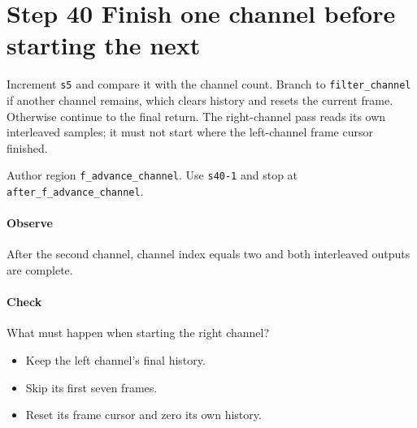 \section{Step 40 Finish one channel before starting the next}\label{pcm-wav-s40}
Increment \texttt{s5} and compare it with the channel count. Branch to \texttt{filter\_channel} if another channel remains, which clears history and resets the current frame. Otherwise continue to the final return. The right-channel pass reads its own interleaved samples; it must not start where the left-channel frame cursor finished.

Author region \texttt{f\_advance\_channel}. Use \texttt{s40-1} and stop at \texttt{after\_f\_advance\_channel}.

\paragraph{Observe} After the second channel, channel index equals two and both interleaved outputs are complete.

\paragraph{Check} What must happen when starting the right channel?
\begin{itemize}
\item[A.] Keep the left channel's final history.
\item[B.] Skip its first seven frames.
\item[C.] Reset its frame cursor and zero its own history.
\end{itemize}

